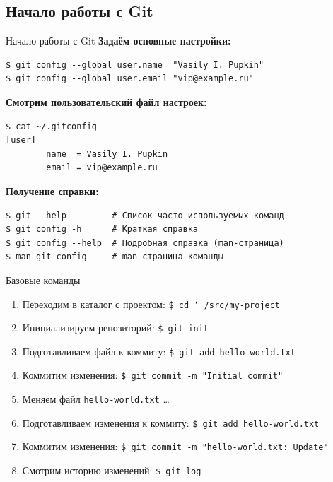 \documentclass[presentation]{beamer}
\begin{document}


\subsection{Начало работы с Git}

\begin{frame}[fragile]{Начало работы с Git}
  \textbf{Задаём основные настройки:}
\begin{verbatim}
$ git config --global user.name  "Vasily I. Pupkin"
$ git config --global user.email "vip@example.ru"
\end{verbatim}
  \textbf{Смотрим пользовательский файл настроек:}
\begin{verbatim}
$ cat ~/.gitconfig
[user]
        name  = Vasily I. Pupkin
        email = vip@example.ru
\end{verbatim}
  \textbf{Получение справки:}
\begin{verbatim}
$ git --help         # Список часто используемых команд
$ git config -h      # Краткая справка
$ git config --help  # Подробная справка (man-страница)
$ man git-config     # man-страница команды
\end{verbatim}
\end{frame}

\begin{frame}[fragile]{Базовые команды}
  \begin{enumerate}
  \item Переходим в каталог с проектом: \newline
    \texttt{\$ cd \char`~/src/my-project}
  \item Инициализируем репозиторий: \newline
    \texttt{\$ git init}
  \item Подготавливаем файл к коммиту: \newline
    \texttt{\$ git add hello-world.txt}
  \item Коммитим изменения: \newline
    \texttt{\$ git commit -m "Initial commit"}
  \item Меняем файл \texttt{hello-world.txt} \ldots
  \item Подготавливаем изменения к коммиту: \newline
    \texttt{\$ git add hello-world.txt}
  \item Коммитим изменения: \newline
    \texttt{\$ git commit -m "hello-world.txt: Update"}
  \item Смотрим историю изменений: \newline
    \texttt{\$ git log}
  \end{enumerate}
\end{frame}
\end{document}
